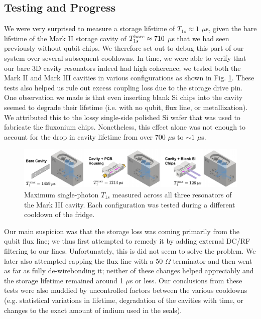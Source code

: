 \subsection{Testing and Progress}
We were very surprised to measure a storage lifetime of $T_{1s} \approx 1$ $\mu$s, given the bare lifetime of the Mark II storage cavity of $T_{1s}^{\rm bare} \approx 710$ $\mu$s that we had seen previously without qubit chips. We therefore set out to debug this part of our system over several subsequent cooldowns. In time, we were able to verify that our bare 3D cavity resonators indeed had high coherence; we tested both the Mark II and Mark III cavities in various configurations as shown in Fig. \ref{fig:4_3D_Cavity_Debugging}. These tests also helped us rule out excess coupling loss due to the storage drive pin. One observation we made is that even inserting blank Si chips into the cavity seemed to degrade their lifetime (i.e. with no qubit, flux line, or metallization). We attributed this to the lossy single-side polished Si wafer that was used to fabricate the fluxonium chips. Nonetheless, this effect alone was not enough to account for the drop in cavity lifetime from over 700 $\mu$s to $\sim\!1$ $\mu$s. 

\begin{figure}[t]
    \centering
    \includegraphics[width=\linewidth]{Figures/4/3D_Cavity_Debugging.pdf}
    \caption{Maximum single-photon $T_{1s}$ measured across all three resonators of the Mark III cavity. Each configuration was tested during a different cooldown of the fridge.}
    \label{fig:4_3D_Cavity_Debugging}
\end{figure}

Our main suspicion was that the storage loss was coming primarily from the qubit flux line; we thus first attempted to remedy it by adding external DC/RF filtering to our lines. Unfortunately, this is did not seem to solve the problem. We later also attempted capping the flux line with a 50 $\Omega$ terminator and then went as far as fully de-wirebonding it; neither of these changes helped appreciably and the storage lifetime remained around 1 $\mu$s or less. Our conclusions from these tests were also muddied by uncontrolled factors between the various cooldowns (e.g. statistical variations in lifetime, degradation of the cavities with time, or changes to the exact amount of indium used in the seals). 

